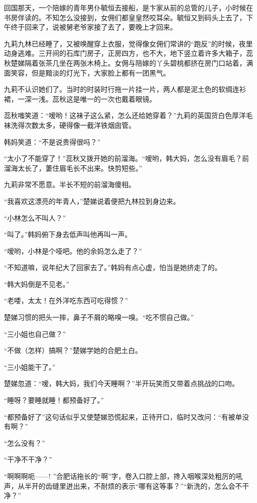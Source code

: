 \par 回国那天，一个陪嫁的青年男仆毓恒去接船，是卞家从前的总管的儿子，小时候在书房伴读的。不知怎么没接到，女佣们都皇皇然咬耳朵。毓恒又到码头上去了，下午终于回来了，说被舅老爷家接了去了，要晚上才回来。
\par 九莉九林已经睡了，又被唤醒穿上衣服，觉得像女佣们常讲的“跑反”的时候，夜里动身逃难。三开间的石库门房子，正房四方，也不大，地下竖立着许多大箱子，蕊秋楚娣隔着张茶几坐在两张木椅上。女佣与陪嫁的丫头碧桃都挤在房门口站着，满面笑容，但是黯淡的灯光下，大家脸上都有一团黑气。
\par 九莉不认识她们了。当时的时装时行拖一片挂一片，两人都是泥土色的软绸连衫裙，一深一浅。蕊秋这是唯一的一次也戴着眼镜。
\par 蕊秋嗤笑道：“嗳哟！这袜子这么紧，怎么还给她穿着？”九莉的英国货白色厚洋毛袜洗得次数太多，硬得像一截洋铁烟囱管。
\par 韩妈笑道：“不是说贵得很吗？”
\par “太小了不能穿了！”蕊秋又拨开她的前溜海。“嗳哟，韩大妈，怎么没有眉毛？前溜海太长了，萋住眉毛长不出来。快剪短些。”
\par 九莉非常不愿意。半长不短的前溜海傻相。
\par “我喜欢这漂亮的年青人，”楚娣说着便把九林拉到身边来。
\par “小林怎么不叫人？”
\par “叫了。”韩妈俯下身去低声叫他再叫一声。
\par “嗳哟，小林是个哑吧。他的余妈怎么走了？”
\par “不知道嘛，说年纪大了回家去了。”韩妈有点心虚，怕当是她挤走了的。
\par “韩大妈倒是不见老。”
\par “老喽，太太！在外洋吃东西可吃得惯？”
\par 楚娣习惯的把头一摔，鼻子不屑的略嗅一嗅。“吃不惯自己做。”
\par “三小姐也自己做？”
\par “不做\KouJiang （怎样）搞啊？”楚娣学她的合肥土白。
\par “三小姐能干了。”
\par 楚娣忽道：“嗳，韩大妈，我们今天\KouJiang 睡啊？”半开玩笑而又带着点挑战的口吻。
\par “\KouJiang 睡呀？要\KouJiang 睡就\KouJiang 睡！都预备好了。”
\par “都预备好了”这句话似乎又使楚娣恐慌起来，正待开口，临时又改问：“有被单没有啊？”
\par “怎么没有？”
\par “干净不干净？”
\par “啊啊啊呃——! ”合肥话拖长的“啊”字，卷入口腔上部，搀入咽喉深处粗厉的吼声，从半开的齿缝里迸出来，不耐烦的表示“哪有这等事？”“新洗的，怎么会不干净？”
